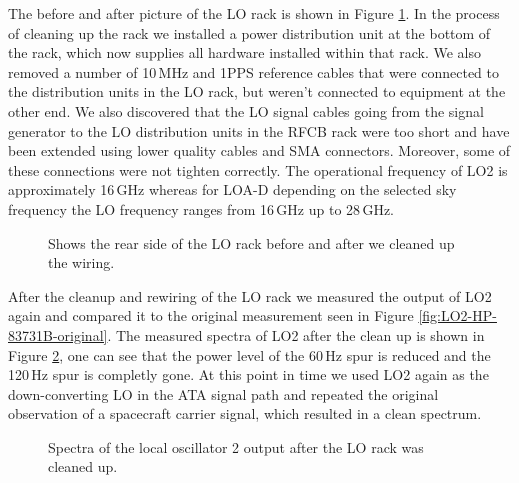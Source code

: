 \documentclass[12pt]{article}
\begin{document}
The before and after picture of the LO rack is shown in Figure \ref{fig:before-after}. In the process of cleaning up the rack we installed a power distribution unit at the bottom of the rack, which now supplies all hardware installed within that rack. We also removed a number of 10\,MHz and 1PPS reference cables that were connected to the distribution units in the LO rack, but weren't connected to equipment at the other end. We also discovered that the LO signal cables going from the signal generator to the LO distribution units in the RFCB rack were too short and have been extended using lower quality cables and SMA connectors. Moreover, some of these connections were not tighten correctly. The operational frequency of LO2 is approximately 16\,GHz whereas for LOA-D depending on the selected sky frequency the LO frequency ranges from 16\,GHz up to 28\,GHz.


%
\begin{figure}[H]
\caption{Shows the rear side of the LO rack before and after we cleaned up the wiring.}
\label{fig:before-after}
\end{figure}
%



After the cleanup and rewiring of the LO rack we measured the output of LO2 again and compared it to the original measurement seen in Figure \ref{fig:LO2-HP-83731B-original}. The measured spectra of LO2 after the clean up is shown in Figure \ref{fig:LO2-HP-83731B-after-rack-cleanup}, one can see that the power level of the 60\,Hz spur is reduced and the 120\,Hz spur is completly gone. At this point in time we used LO2 again as the down-converting LO in the ATA signal path and repeated the original observation of a spacecraft carrier signal, which resulted in a clean spectrum. 

%
\begin{figure}[H]
\caption{Spectra of the local oscillator 2 output after the LO rack was cleaned up.}
\label{fig:LO2-HP-83731B-after-rack-cleanup}
\end{figure}
%
\end{document}
